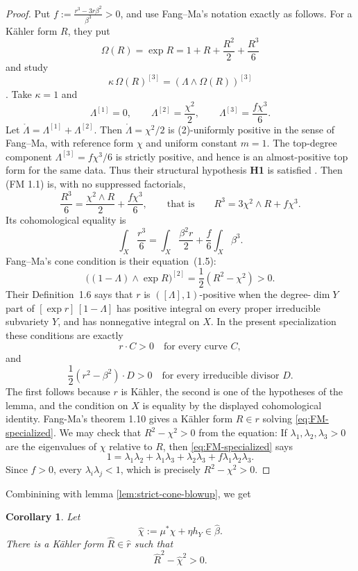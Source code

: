 \documentclass[reqno]{amsart}
\theoremstyle{remark}
\theoremstyle{plain}
\newtheorem{cor}[thm]{Corollary}
\begin{document}
\begin{proof}
    Put $f:=\frac{r^3-3r\beta^2}{\beta^3}>0$, and use Fang--Ma's notation exactly as follows.  For a K\"ahler form
$R$, they put
\[
 \Omega(R)=\exp R=1+R+\frac{R^2}{2}+\frac{R^3}{6}
\]
and study
\[
 \kappa\,\Omega(R)^{[3]}=(\Lambda\wedge\Omega(R))^{[3]}
 \tag{FM 1.1}
\]
\cite[equation~(1.1)]{FM24}.  Take $\kappa=1$ and
\[
 \Lambda^{[1]}=0,\qquad
 \Lambda^{[2]}=\frac{\chi^2}{2},\qquad
 \Lambda^{[3]}=\frac{f\chi^3}{6}.
\]
Let $\mathring\Lambda=\Lambda^{[1]}+\Lambda^{[2]}$.  Then
$\mathring\Lambda=\chi^2/2$ is (2)-uniformly positive in the
sense of Fang--Ma, with reference form $\chi$ and uniform constant
$m=1$.  The top-degree component
$\Lambda^{[3]}=f\chi^3/6$ is strictly positive, and hence is an
almost-positive top form for the same data.  Thus their structural
hypothesis  \textbf{H1} is satisfied
\cite{FM24}.
Then (FM 1.1) is, with no suppressed factorials,
\begin{equation}\label{eq:FM-specialized}
 \frac{R^3}{6}
 =\frac{\chi^2\wedge R}{2}+\frac{f\chi^3}{6},
 \qquad\text{that is}\qquad
 R^3=3\chi^2\wedge R+f\chi^3.
\end{equation}
Its cohomological equality is
\[
 \int_X\frac{r^3}{6}
 =\int_X\frac{\beta^2r}{2}+\frac f6\int_X\beta^3.
\]
Fang--Ma's cone condition is their equation~(1.5):
\[
 \bigl((1-\Lambda)\wedge\exp R\bigr)^{[2]}
 =\frac12(R^2-\chi^2)>0.
 \tag{FM 1.5}
\]
Their Definition~1.6 says that $r$ is
$([\Lambda],1)$-positive when the degree-$\dim Y$ part of
$[\exp r]\,[1-\Lambda]$ has positive integral on every proper
irreducible subvariety $Y$, and has nonnegative integral on $X$.
In the present specialization these conditions are exactly
\[
 r\cdot C>0
 \quad\text{for every curve }C,
\]
and
\[
 \frac12(r^2-\beta^2)\cdot D>0
 \quad\text{for every irreducible divisor }D.
\]
The first follows because $r$ is K\"ahler, the second is one of the hypotheses of the lemma, and the condition on $X$ is equality by
the displayed cohomological identity. Fang-Ma's theorem 1.10 \cite{FM24} gives a K\"ahler form $R\in r$ solving \eqref{eq:FM-specialized}. We may check that $R^2-\chi^2>0$ from the equation: If $\lambda_1,\lambda_2,\lambda_3>0$ are the eigenvalues
of $\chi$ relative to $R$, then \eqref{eq:FM-specialized} says
\[
 1=\lambda_1\lambda_2+\lambda_1\lambda_3+
   \lambda_2\lambda_3+f\lambda_1\lambda_2\lambda_3.
\]
Since $f>0$, every $\lambda_i\lambda_j<1$, which is precisely
$R^2-\chi^2>0$.
\end{proof}

Combinining with lemma \ref{lem:strict-cone-blowup}, we get 
\begin{cor}\label{cor:strict-cone-blowup}Let \[ \widehat{\chi}:=\mu^*\chi+\eta h_Y\in \widehat{\beta}.\] There is a K\"ahler form $\widehat{R}\in \widehat{r}$ such that \[
\widehat{R}^2-\widehat{\chi}^2>0.
\]
\end{cor}
\end{document}
